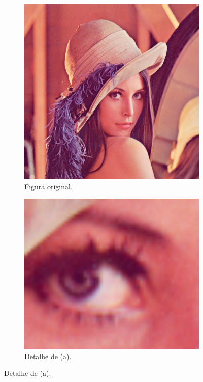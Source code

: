 \def\WORIG{.45\textwidth}
\def\WDET{.525\textwidth}

\begin{figure}[!t]
  \begin{subfigure}{\WORIG}
    \centering
    \includegraphics[width=1\textwidth]{images/01/lena_orig.png}
    \caption{\label{fig:compress:orig} Figura original.}
  \end{subfigure}
  \begin{subfigure}{\WDET}
    \centering
    \includegraphics[width=1\textwidth]{images/01/lena_orig_eye.png}
    \caption{\label{fig:compress:orig:eye} Detalhe de (a).}
  \end{subfigure}
  

\end{figure}

